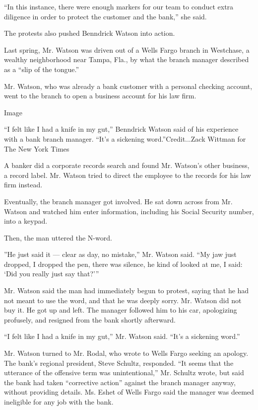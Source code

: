 ``In this instance, there were enough markers for our team to conduct
extra diligence in order to protect the customer and the bank,'' she
said.

The protests also pushed Benndrick Watson into action.

Last spring, Mr. Watson was driven out of a Wells Fargo branch in
Westchase, a wealthy neighborhood near Tampa, Fla., by what the branch
manager described as a ``slip of the tongue.''

Mr. Watson, who was already a bank customer with a personal checking
account, went to the branch to open a business account for his law firm.

Image

``I felt like I had a knife in my gut,'' Benndrick Watson said of his
experience with a bank branch manager. ``It's a sickening
word.''Credit...Zack Wittman for The New York Times

A banker did a corporate records search and found Mr. Watson's other
business, a record label. Mr. Watson tried to direct the employee to the
records for his law firm instead.

Eventually, the branch manager got involved. He sat down across from Mr.
Watson and watched him enter information, including his Social Security
number, into a keypad.

Then, the man uttered the N-word.

''He just said it --- clear as day, no mistake,'' Mr. Watson said. ``My
jaw just dropped, I dropped the pen, there was silence, he kind of
looked at me, I said: `Did you really just say that?'''

Mr. Watson said the man had immediately begun to protest, saying that he
had not meant to use the word, and that he was deeply sorry. Mr. Watson
did not buy it. He got up and left. The manager followed him to his car,
apologizing profusely, and resigned from the bank shortly afterward.

``I felt like I had a knife in my gut,'' Mr. Watson said. ``It's a
sickening word.''

Mr. Watson turned to Mr. Rodal, who wrote to Wells Fargo seeking an
apology. The bank's regional president, Steve Schultz, responded. ``It
seems that the utterance of the offensive term was unintentional,'' Mr.
Schultz wrote, but said the bank had taken ``corrective action'' against
the branch manager anyway, without providing details. Ms. Eshet of Wells
Fargo said the manager was deemed ineligible for any job with the bank.

